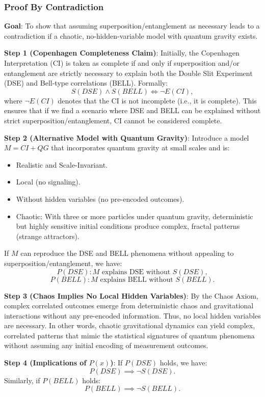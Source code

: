 \documentclass{article}
\begin{document}
\subsubsection*{Proof By Contradiction}

\textbf{Goal}: To show that assuming superposition/entanglement as necessary leads to a contradiction if a chaotic, no-hidden-variable model with quantum gravity exists.

\textbf{Step 1 (Copenhagen Completeness Claim)}:
 Initially, the Copenhagen Interpretation (CI) is taken as complete if and only if superposition and/or entanglement are strictly necessary to explain both the Double Slit Experiment (DSE) and Bell-type correlations (BELL). Formally:
\[
S(DSE) \wedge S(BELL) \iff \neg E(CI),
\]
where $\neg E(CI)$ denotes that the CI is not incomplete (i.e., it is complete). This ensures that if we find a scenario where DSE and BELL can be explained without strict superposition/entanglement, CI cannot be considered complete.

\textbf{Step 2 (Alternative Model with Quantum Gravity)}:
Introduce a model $M = CI + QG$ that incorporates quantum gravity at small scales and is:
\begin{itemize}
    \item Realistic and Scale-Invariant.
    \item Local (no signaling).
    \item Without hidden variables (no pre-encoded outcomes).
    \item Chaotic: With three or more particles under quantum gravity, deterministic but highly sensitive initial conditions produce complex, fractal patterns (strange attractors).
\end{itemize}

If $M$ can reproduce the DSE and BELL phenomena without appealing to superposition/entanglement, we have:
\[
P(DSE): M \text{ explains DSE without } S(DSE),
\]
\[
P(BELL): M \text{ explains BELL without } S(BELL).
\]

\textbf{Step 3 (Chaos Implies No Local Hidden Variables)}:
By the Chaos Axiom, complex correlated outcomes emerge from deterministic chaos and gravitational interactions without any pre-encoded information. Thus, no local hidden variables are necessary. In other words, chaotic gravitational dynamics can yield complex, correlated patterns that mimic the statistical signatures of quantum phenomena without assuming any initial encoding of measurement outcomes.

\textbf{Step 4 (Implications of $P(x)$)}:
If $P(DSE)$ holds, we have:
\[
P(DSE) \implies \neg S(DSE).
\]
Similarly, if $P(BELL)$ holds:
\[
P(BELL) \implies \neg S(BELL).
\]
\end{document}
